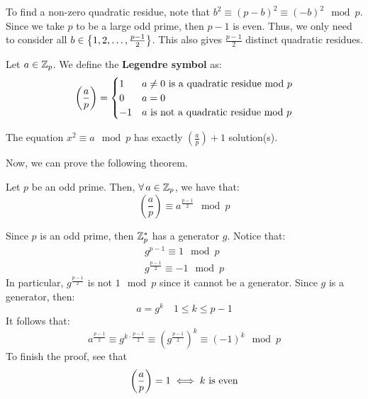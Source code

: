 \documentclass{article}
\begin{document}
To find a non-zero quadratic residue, note that $ b^{2} \equiv (p - b)^{2} \equiv (-b)^{2} \mod p $.
Since we take $ p $ to be a large odd prime, then $ p - 1 $ is even.
Thus, we only need to consider all $ b \in \left\{{1, 2, \dots, \frac{p - 1}{2}}\right\} $.
This also gives $ \frac{p - 1}{2} $ distinct quadratic residues.

\begin{defn}
    Let $ a \in \mathbb{Z}_{p} $. We define the \textbf{Legendre symbol} as:
    \begin{equation*}
        \left( \frac{a}{p} \right) = 
        \begin{cases} 
            1 & a \neq 0 \textrm{ is a quadratic residue} \ \mathrm{mod}\ p \\
            0 & a = 0 \\
            -1 & a \textrm{ is not a quadratic residue} \ \mathrm{mod}\ p
        \end{cases}
    \end{equation*}
\end{defn}

\begin{crll}
    The equation $ x^{2} \equiv a \mod p $ has exactly $ (\frac{a}{p}) + 1 $ solution(s).
\end{crll}

Now, we can prove the following theorem.

\begin{thm}[title=Euler's Criterion]
    Let $ p $ be an odd prime.
    Then, $ \forall \, a \in \mathbb{Z}_{p} $, we have that:
    \begin{equation*}
        \left( \frac{a}{p} \right) \equiv a^{\frac{p - 1}{2}} \mod p
    \end{equation*}
\end{thm}

\begin{pf}[source=Primary Source Material]
    Since $ p $ is an odd prime, then $ \mathbb{Z}_{p}^{*} $ has a generator $ g $.
    Notice that:
    \begin{gather*}
        g^{p - 1} \equiv 1 \mod p \\
        g^{\frac{p - 1}{2}} \equiv -1 \mod p
    \end{gather*}
    In particular, $ g^{\frac{p - 1}{2}} $ is not $ 1 \mod p $ since it cannot be a generator. \vsp
    Since $ g $ is a generator, then:
    \begin{equation*}
        a = g^{k} \quad 1 \leq k \leq p - 1
    \end{equation*}
    It follows that:
    \begin{equation*}
        a^{\frac{p - 1}{2}} \equiv g^{k \cdot \frac{p - 1}{2}}
        \equiv \left( g^{\frac{p - 1}{2}} \right)^{k} \equiv (-1)^{k} \mod p
    \end{equation*}
    To finish the proof, see that
    \begin{equation*}
        \left( \frac{a}{p} \right) = 1 \iff k \textrm{ is even}
    \end{equation*}
\end{pf}
\end{document}
